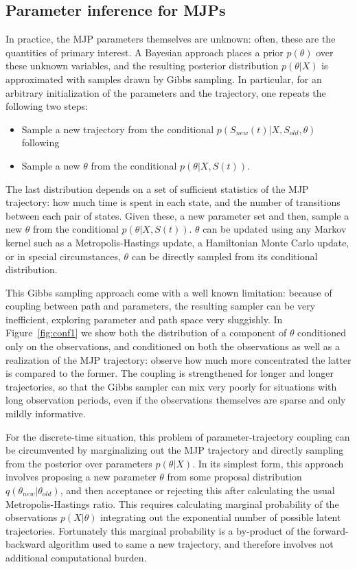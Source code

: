 \subsection{Parameter inference for MJPs}
In practice, the MJP parameters themselves are unknown: often,
these are the quantities of primary interest. A Bayesian approach
places a prior $p(\theta)$ over these unknown variables, and the
resulting posterior distribution $p(\theta|X)$ is approximated
with samples drawn by Gibbs sampling. In particular, for an arbitrary 
initialization of the parameters and the trajectory, one repeats the
following two steps:
\begin{itemize}
  \item Sample a new trajectory from the conditional 
    $p(S_{new}(t)|X,S_{old},\theta)$ following \cite{RaoTeh12}
  \item Sample a new $\theta$ from the conditional $p(\theta|X,S(t))$. 
\end{itemize}
The last distribution depends on a set of sufficient statistics of the 
MJP trajectory: how
much time is spent in each state, and the number of transitions
between each pair of states. Given these, a new parameter set
and then, sample a new $\theta$ from the conditional $p(\theta|X,S(t))$. 
$\theta$ can be updated using any Markov kernel such as a 
Metropolis-Hastings update, a Hamiltonian Monte Carlo update, or in 
special circumstances, $\theta$ can be directly sampled from its 
conditional distribution.

This Gibbs sampling approach come with a well known limitation:
because of coupling between path and parameters, the resulting
sampler can be very inefficient, exploring parameter and
path space very sluggishly. In Figure~\ref{fig:conf1} we show
both the distribution of a component of $\theta$ conditioned
only on the observations, and conditioned on both the observations 
as well as a realization of the MJP trajectory: observe how much
more concentrated the latter is compared to the former. The
coupling is strengthened for longer and longer trajectories, so
that the Gibbs sampler can mix very poorly for situations with
long observation periods, even if the observations themselves are
sparse and only mildly informative.

For the discrete-time situation, this problem of parameter-trajectory
coupling can be circumvented by marginalizing out the MJP trajectory 
and directly sampling from the posterior over parameters $p(\theta|X)$.
In its simplest form, this approach involves proposing a new parameter
$\theta$ from some proposal distribution $q(\theta_{new}|\theta_{old})$,
and then acceptance or rejecting this after calculating the usual
Metropolis-Hastings ratio. This requires calculating marginal 
probability of the observations $p(X|\theta)$ integrating out
the exponential number of possible latent trajectories. Fortunately
this marginal probability is a by-product of the forward-backward
algorithm used to same a new trajectory, and therefore involves not 
additional computational burden.

